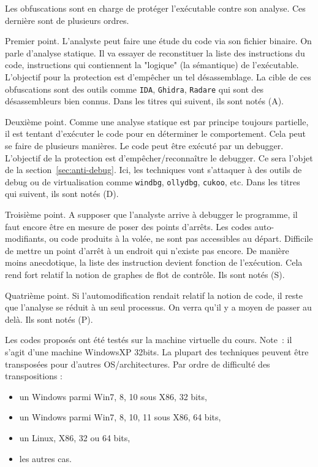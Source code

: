 \documentclass{book}
\begin{document}
Les obfuscations sont en charge de protéger l'exécutable contre son analyse. Ces dernière sont de plusieurs ordres. 

Premier point. L'analyste peut faire une étude du code via son fichier binaire. On parle d'analyse statique. Il va essayer de reconstituer la liste des instructions du code, instructions qui contiennent la "logique" (la sémantique) de l'exécutable. L'objectif pour la protection est d'empêcher un tel désassemblage. La cible de ces obfuscations sont des outils comme {\tt IDA}, {\tt Ghidra}, {\tt Radare} qui sont des désassembleurs bien connus. Dans les titres qui suivent, ils sont notés (A). 

Deuxième point. Comme une analyse statique est par principe toujours partielle, il est tentant d'exécuter le code pour en déterminer le comportement. Cela peut se faire de plusieurs manières. Le code peut être exécuté par un debugger. L'objectif de la protection est d'empêcher/reconnaître le debugger. Ce sera l'objet de la section~\ref{sec:anti-debug}. Ici, les techniques vont s'attaquer à des outils de debug ou de virtualisation comme {\tt windbg}, {\tt ollydbg}, {\tt cukoo}, etc. Dans les titres qui suivent, ils sont notés (D). 

Troisième point. A supposer que l'analyste arrive à debugger le programme, il faut encore être en mesure de poser des points d'arrêts. Les codes auto-modifiants, ou code produits à la volée, ne sont pas accessibles au départ. Difficile de mettre un point d'arrêt à un endroit qui n'existe pas encore. De manière moins anecdotique, la liste des instruction devient fonction de l'exécution. Cela rend fort relatif la notion de graphes de flot de contrôle. Ils sont notés (S). 

Quatrième point. Si l'automodification rendait relatif la notion de code, il reste que l'analyse se réduit à un seul processus. On verra qu'il y a moyen de passer au delà. Ils sont notés (P).


Les codes proposés ont été testés sur la machine virtuelle du cours. Note~: il s'agit d'une machine WindowsXP 32bits. La plupart des techniques peuvent être transposées pour d'autres OS/architectures. Par ordre de difficulté des transpositions : 
\begin{itemize}
	\item un Windows parmi Win7, 8, 10 sous X86, 32 bits,
	\item un Windows parmi Win7, 8, 10, 11 sous X86, 64 bits,
	\item un Linux, X86, 32 ou 64 bits,
	\item les autres cas. 
\end{itemize}
\end{document}
